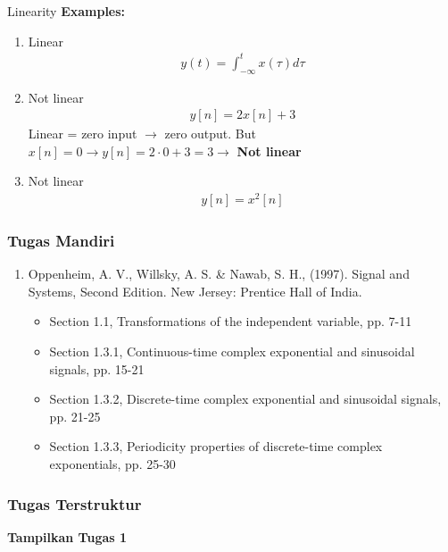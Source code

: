 \documentclass[pdflatex,compress,mathserif]{beamer}
\begin{document}
\begin{frame}{Linearity}
	\textbf{Examples:}
	\begin{enumerate}
		\item Linear
		\begin{align*}
			y(t) = \int_{-\infty}^{t} x(\tau)d\tau
		\end{align*}
		\item Not linear\\
		\begin{align*}
			y[n] = 2x[n]+3
		\end{align*}
		Linear = zero input $\rightarrow$ zero output. But $ x[n] = 0 \rightarrow y[n] = 2\cdot0 + 3 = 3 \rightarrow$ \textbf{Not linear}
		\item Not linear
		\begin{align*}
			y[n] = x^2[n]
		\end{align*}
	\end{enumerate}
\end{frame}

\begin{frame}
	\frametitle{Tugas Mandiri}
	\begin{enumerate}
		\item Oppenheim, A. V., Willsky, A. S. \& Nawab, S. H., (1997). Signal and Systems, Second Edition. New Jersey: Prentice Hall of India.
		\begin{itemize}
			\item Section 1.1, Transformations of the independent variable, pp. 7-11
			\item Section 1.3.1, Continuous-time complex exponential and sinusoidal signals, pp. 15-21
			\item Section 1.3.2, Discrete-time complex exponential and sinusoidal signals, pp. 21-25
			\item Section 1.3.3, Periodicity properties of discrete-time complex exponentials, pp. 25-30
		\end{itemize}
	\end{enumerate}
\end{frame}

\begin{frame}
	\frametitle{Tugas Terstruktur}
	\textbf{Tampilkan Tugas 1}
\end{frame}
\end{document}
